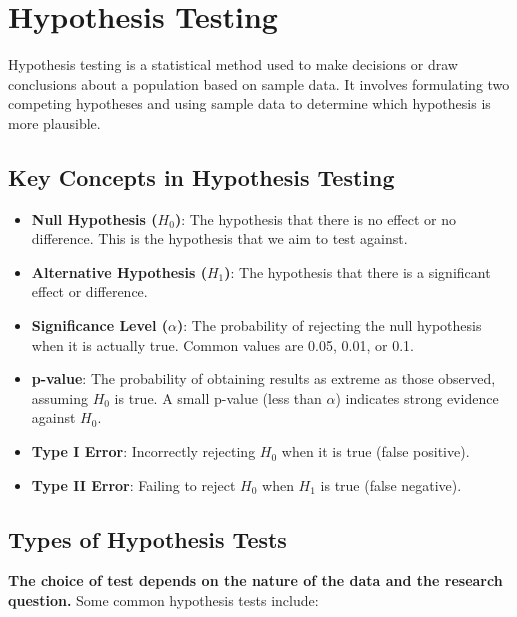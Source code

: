\section{Hypothesis Testing}

Hypothesis testing is a statistical method used to make decisions or draw conclusions about a population based on sample data. It involves formulating two competing hypotheses and using sample data to determine which hypothesis is more plausible.

\subsection{Key Concepts in Hypothesis Testing}
\begin{itemize}
    \item \textbf{Null Hypothesis (\(H_0\))}: The hypothesis that there is no effect or no difference. This is the hypothesis that we aim to test against.
    \item \textbf{Alternative Hypothesis (\(H_1\))}: The hypothesis that there is a significant effect or difference.
    \item \textbf{Significance Level (\(\alpha\))}: The probability of rejecting the null hypothesis when it is actually true. Common values are 0.05, 0.01, or 0.1.
    \item \textbf{p-value}: The probability of obtaining results as extreme as those observed, assuming \(H_0\) is true. A small p-value (less than \(\alpha\)) indicates strong evidence against \(H_0\).
    \item \textbf{Type I Error}: Incorrectly rejecting \(H_0\) when it is true (false positive).
    \item \textbf{Type II Error}: Failing to reject \(H_0\) when \(H_1\) is true (false negative).
\end{itemize}

\subsection{Types of Hypothesis Tests}
\textbf{The choice of test depends on the nature of the data and the research question.} Some common hypothesis tests include:

